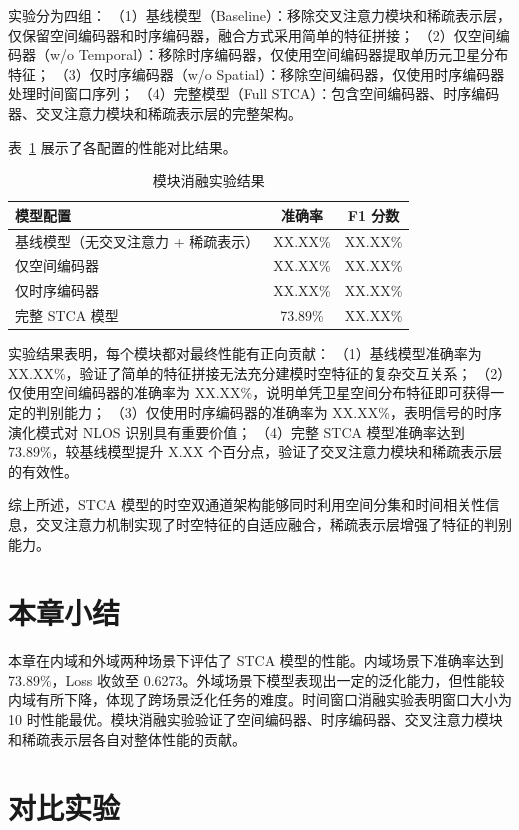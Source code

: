 实验分为四组：
（1）基线模型（Baseline）：移除交叉注意力模块和稀疏表示层，仅保留空间编码器和时序编码器，融合方式采用简单的特征拼接；
（2）仅空间编码器（w/o Temporal）：移除时序编码器，仅使用空间编码器提取单历元卫星分布特征；
（3）仅时序编码器（w/o Spatial）：移除空间编码器，仅使用时序编码器处理时间窗口序列；
（4）完整模型（Full STCA）：包含空间编码器、时序编码器、交叉注意力模块和稀疏表示层的完整架构。

表~\ref{tab:ablation_modules} 展示了各配置的性能对比结果。

\begin{table}[h]
\centering
\caption{模块消融实验结果}
\label{tab:ablation_modules}
\begin{tabular}{lcc}
\hline
模型配置 & 准确率 & F1 分数 \\
\hline
基线模型（无交叉注意力 + 稀疏表示） & XX.XX\% & XX.XX\% \\
仅空间编码器 & XX.XX\% & XX.XX\% \\
仅时序编码器 & XX.XX\% & XX.XX\% \\
完整 STCA 模型 & 73.89\% & XX.XX\% \\
\hline
\end{tabular}
\end{table}

实验结果表明，每个模块都对最终性能有正向贡献：
（1）基线模型准确率为 XX.XX\%，验证了简单的特征拼接无法充分建模时空特征的复杂交互关系；
（2）仅使用空间编码器的准确率为 XX.XX\%，说明单凭卫星空间分布特征即可获得一定的判别能力；
（3）仅使用时序编码器的准确率为 XX.XX\%，表明信号的时序演化模式对 NLOS 识别具有重要价值；
（4）完整 STCA 模型准确率达到 73.89\%，较基线模型提升 X.XX 个百分点，验证了交叉注意力模块和稀疏表示层的有效性。

综上所述，STCA 模型的时空双通道架构能够同时利用空间分集和时间相关性信息，交叉注意力机制实现了时空特征的自适应融合，稀疏表示层增强了特征的判别能力。

\section{本章小结}

本章在内域和外域两种场景下评估了 STCA 模型的性能。内域场景下准确率达到 73.89\%，Loss 收敛至 0.6273。外域场景下模型表现出一定的泛化能力，但性能较内域有所下降，体现了跨场景泛化任务的难度。时间窗口消融实验表明窗口大小为 10 时性能最优。模块消融实验验证了空间编码器、时序编码器、交叉注意力模块和稀疏表示层各自对整体性能的贡献。

\section{对比实验}


